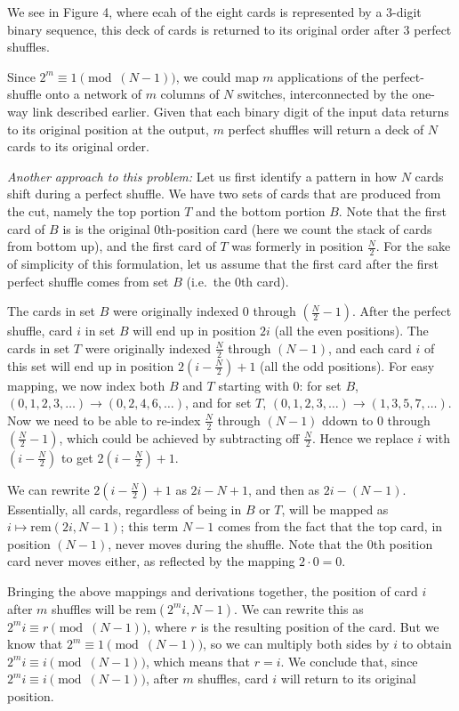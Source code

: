 \documentclass[12pt,twoside]{article}
\begin{document}
\begin{problem}{20}
{        We see in Figure 4, where ecah of the eight cards is represented by a $3$-digit binary sequence, this deck of cards is returned to its original order after $3$ perfect shuffles.

        Since $2^m \equiv 1 \pmod{(N-1)}$, we could map $m$ applications of the perfect-shuffle onto a network of $m$ columns of $N$ switches, interconnected by the one-way link described earlier. Given that each binary digit of the input data returns to its original position at the output, $m$ perfect shuffles will return a deck of $N$ cards to its original order.

        \emph{Another approach to this problem:} Let us first identify a pattern in how $N$ cards shift during a perfect shuffle. We have two sets of cards that are produced from the cut, namely the top portion $T$ and the bottom portion $B$. Note that the first card of $B$ is is the original $0$th-position card (here we count the stack of cards from bottom up), and the first card of $T$ was formerly in position $\frac{N}{2}$. For the sake of simplicity of this formulation, let us assume that the first card after the first perfect shuffle comes from set $B$ (i.e.\ the $0$th card).

        The cards in set $B$ were originally indexed $0$ through $(\frac{N}{2} - 1)$. After the perfect shuffle, card $i$ in set $B$ will end up in position $2i$ (all the even positions). The cards in set $T$ were originally indexed $\frac{N}{2}$ through $(N-1)$, and each card $i$ of this set will end up in position $2(i - \frac{N}{2}) + 1$ (all the odd positions). For easy mapping, we now index both $B$ and $T$ starting with $0$: for set $B$, $(0,1,2,3,\ldots) \to (0,2,4,6,\ldots)$, and for set $T$, $(0,1,2,3,\ldots) \to (1,3,5,7,\ldots)$. Now we need to be able to re-index $\frac{N}{2}$ through $(N-1)$ ddown to $0$ through $(\frac{N}{2} - 1)$, which could be achieved by subtracting off $\frac{N}{2}$. Hence we replace $i$ with $(i - \frac{N}{2})$ to get $2(i - \frac{N}{2}) + 1$.

        We can rewrite $2(i - \frac{N}{2})+1$ as $2i - N + 1$, and then as $2i - (N-1)$. Essentially, all cards, regardless of being in $B$ or $T$, will be mapped as $i \mapsto \mathrm{rem}(2i,N-1)$; this term $N-1$ comes from the fact that the top card, in position $(N-1)$, never moves during the shuffle. Note that the $0$th position card never moves either, as reflected by the mapping $2 \cdot 0 = 0$.

        Bringing the above mappings and derivations together, the position of card $i$ after $m$ shuffles will be $\mathrm{rem}(2^m i, N-1)$. We can rewrite this as $2^m i \equiv r \pmod{(N-1)}$, where $r$ is the resulting position of the card. But we know that $2^m \equiv 1 \pmod{(N-1)}$, so we can multiply both sides by $i$ to obtain $2^m i \equiv i \pmod{(N-1)}$, which means that $r = i$. We conclude that, since $2^m i \equiv i \pmod{(N-1)}$, after $m$ shuffles, card $i$ will return to its original position.
         
}
\end{problem}
\end{document}
